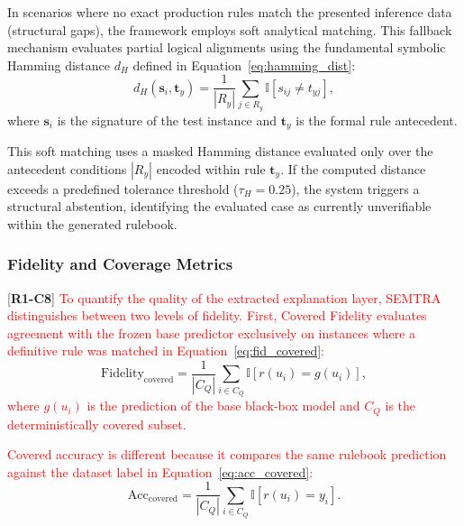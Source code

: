 \documentclass[make,article,submit,pdftex,moreauthors]{Definitions/mdpi}
\newcommand{\revtag}[2]{[\textbf{R#1-C#2}]}
\newcommand{\Rone}[1]{\textcolor{red}{#1}}
\begin{document}
In scenarios where no exact production rules match the presented inference data (structural gaps), the framework employs soft analytical matching. This fallback mechanism evaluates partial logical alignments using the fundamental symbolic Hamming distance $d_H$ defined in Equation~\eqref{eq:hamming_dist}:
\begin{equation}
 \label{eq:hamming_dist}
 d_H(\mathbf{s}_i,\mathbf{t}_y) = \frac{1}{|R_y|}\sum_{j \in R_y}\mathbb{I}[s_{ij} \neq t_{yj}],
\end{equation}
where $\mathbf{s}_i$ is the signature of the test instance and $\mathbf{t}_y$ is the formal rule antecedent.

This soft matching uses a masked Hamming distance evaluated only over the antecedent conditions $|R_y|$ encoded within rule $\mathbf{t}_y$. If the computed distance exceeds a predefined tolerance threshold ($\tau_H = 0.25$), the system triggers a structural abstention, identifying the evaluated case as currently unverifiable within the generated rulebook.

\subsubsection{Fidelity and Coverage Metrics}

\revtag{1}{8} \Rone{To quantify the quality of the extracted explanation layer, SEMTRA distinguishes between two levels of fidelity. First, Covered Fidelity evaluates agreement with the frozen base predictor exclusively on instances where a definitive rule was matched in Equation~\eqref{eq:fid_covered}:}
\begin{equation}
 \label{eq:fid_covered}
 \mathrm{Fidelity}_{\mathrm{covered}} = \frac{1}{|C_Q|}\sum_{i \in C_Q}\mathbb{I}[r(u_i) = g(u_i)],
\end{equation}
\Rone{where $g(u_i)$ is the prediction of the base black-box model and $C_Q$ is the deterministically covered subset.}

\Rone{Covered accuracy is different because it compares the same rulebook prediction against the dataset label in Equation~\eqref{eq:acc_covered}:}
\begin{equation}
 \label{eq:acc_covered}
 \mathrm{Acc}_{\mathrm{covered}} = \frac{1}{|C_Q|}\sum_{i \in C_Q}\mathbb{I}[r(u_i) = y_i].
\end{equation}
\end{document}
